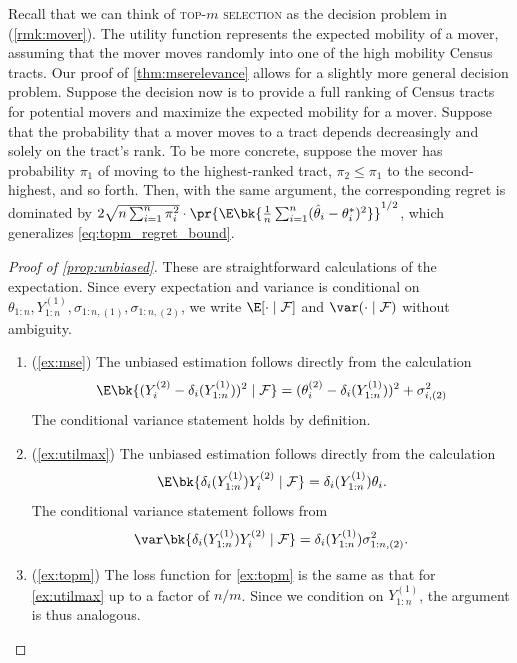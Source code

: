 \documentclass[12pt, reqno]{amsart}
\newif\ifrepeatthm
\newcommand{\topm}{\textsc{top-{\small $m$} selection}}
\numberwithin{equation}{section}
\begin{document}
\begin{appendices}
\begin{rmksq}
\label{rmk:nonuniform}
Recall that we can think of \topm{} as the decision problem in
\citet{bergman2019creating} (\cref{rmk:mover}). The utility function represents the
 expected mobility of a mover, assuming that the mover moves randomly into one of the
 high mobility Census tracts. Our proof of \cref{thm:mserelevance} allows for a slightly
 more general decision problem. Suppose the decision now is to provide a full ranking of
 Census tracts for potential movers and maximize the expected mobility for a mover.
 Suppose that the probability that a mover moves to a tract depends decreasingly and
 solely on the tract's rank. To be more concrete, suppose the mover has probability
 $\pi_1$ of moving to the highest-ranked tract, $\pi_2 \le \pi_1$ to the second-highest,
 and so
 forth. Then, with the same argument, the corresponding regret is dominated by $2\sqrt
 {n \sum_{i=1}^n \pi_i^2} \cdot 
\pr{\E\bk{\frac{1}{n} \sum_{i=1}^n (\hat\theta_i - \theta_i^*)^2}}^{1/2}$, which
generalizes \eqref{eq:topm_regret_bound}.
\end{rmksq}


\ifrepeatthm\unbiased*\fi

\begin{proof}[Proof of \cref{prop:unbiased}] 
These are straightforward calculations of the
expectation. 
Since every expectation and variance is conditional on $\theta_{1:n},
Y^{(1)}_{1:n}, \sigma_{1:n, (1)}, \sigma_{1:n, (2)}$, we write $\E[\cdot \mid \mathcal F]$
and $\var(\cdot \mid \mathcal F)$ without ambiguity.

\begin{enumerate}[wide]
  \item (\cref{ex:mse}) The unbiased estimation follows directly from the calculation
  \begin{align*}
  \E\bk{
(Y_i^{(2)} - \delta_i(Y_{1:n}^{(1)}))^2
  \mid \mathcal F} = (\theta_i^{(2)} -  \delta_i(Y_{1:n}^{(1)}))^2 + \sigma_{i, (2)}^2
  \end{align*}
  The conditional variance statement holds by definition.
  \item (\cref{ex:utilmax}) The unbiased estimation follows directly from the calculation
  \[
 \E\bk{
 \delta_i(Y_{1:n}^{(1)})Y_i^{(2)} 
  \mid \mathcal F} = \delta_i(Y_{1:n}^{(1)}) \theta_i.
  \]
  The conditional variance statement follows from \[
\var\bk{
 \delta_i(Y_{1:n}^{(1)})
Y_i^{(2)}
  \mid \mathcal F} = \delta_i(Y_{1:n}^{(1)}) \sigma_{1:n, (2)}^2.
  \]

  \item (\cref{ex:topm}) The loss function for \cref{ex:topm} is the same as that for 
  \cref{ex:utilmax} up to a factor of $n/m$. Since we condition on $Y_{1:n}^{(1)}$, the
  argument is thus analogous.
  \qedhere
\end{enumerate}
\end{proof}
\end{appendices}
\end{document}
